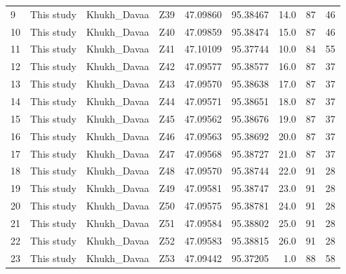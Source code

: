 \documentclass[11pt]{article}
\begin{document}
{\begin{tabular}{llllrrrrr}
9  &        This study &     Khukh\_Davaa  &          Z39 &  47.09860 &  95.38467 &       14.0 &                        87 &              46 \\
10 &        This study &     Khukh\_Davaa  &          Z40 &  47.09859 &  95.38474 &       15.0 &                        87 &              46 \\
11 &        This study &     Khukh\_Davaa  &          Z41 &  47.10109 &  95.37744 &       10.0 &                        84 &              55 \\
12 &        This study &     Khukh\_Davaa  &          Z42 &  47.09577 &  95.38577 &       16.0 &                        87 &              37 \\
13 &        This study &     Khukh\_Davaa  &          Z43 &  47.09570 &  95.38638 &       17.0 &                        87 &              37 \\
14 &        This study &     Khukh\_Davaa  &          Z44 &  47.09571 &  95.38651 &       18.0 &                        87 &              37 \\
15 &        This study &     Khukh\_Davaa  &          Z45 &  47.09562 &  95.38676 &       19.0 &                        87 &              37 \\
16 &        This study &     Khukh\_Davaa  &          Z46 &  47.09563 &  95.38692 &       20.0 &                        87 &              37 \\
17 &        This study &     Khukh\_Davaa  &          Z47 &  47.09568 &  95.38727 &       21.0 &                        87 &              37 \\
18 &        This study &     Khukh\_Davaa  &          Z48 &  47.09570 &  95.38744 &       22.0 &                        91 &              28 \\
19 &        This study &     Khukh\_Davaa  &          Z49 &  47.09581 &  95.38747 &       23.0 &                        91 &              28 \\
20 &        This study &     Khukh\_Davaa  &          Z50 &  47.09575 &  95.38781 &       24.0 &                        91 &              28 \\
21 &        This study &     Khukh\_Davaa  &          Z51 &  47.09584 &  95.38802 &       25.0 &                        91 &              28 \\
22 &        This study &     Khukh\_Davaa  &          Z52 &  47.09583 &  95.38815 &       26.0 &                        91 &              28 \\
23 &        This study &     Khukh\_Davaa  &          Z53 &  47.09442 &  95.37205 &        1.0 &                        88 &              58 \\

\end{tabular}}
\end{document}
